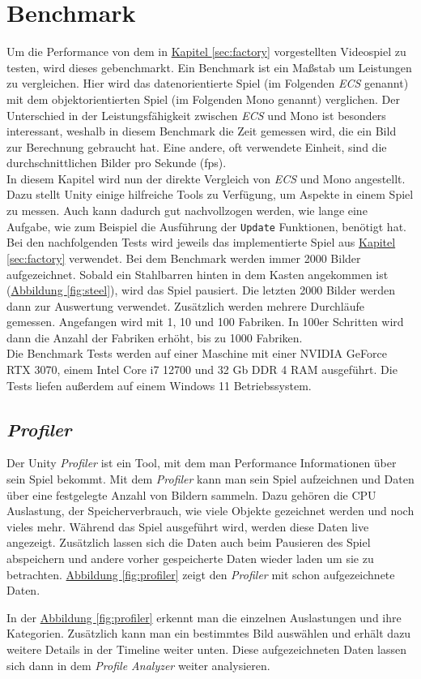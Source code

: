 \section{Benchmark}
Um die Performance von dem in \hyperref[sec:factory]{Kapitel \ref{sec:factory}} vorgestellten Videospiel zu testen, wird dieses gebenchmarkt. Ein Benchmark ist ein Maßstab um Leistungen zu vergleichen. Hier wird das datenorientierte Spiel (im Folgenden \textit{ECS} genannt) mit dem objektorientierten Spiel (im Folgenden Mono genannt) verglichen. Der Unterschied in der Leistungsfähigkeit zwischen \textit{ECS} und Mono ist besonders interessant, weshalb in diesem Benchmark die Zeit gemessen wird, die ein Bild zur Berechnung gebraucht hat. Eine andere, oft verwendete Einheit, sind die durchschnittlichen Bilder pro Sekunde (fps).\\
In diesem Kapitel wird nun der direkte Vergleich von \textit{ECS} und Mono angestellt. Dazu stellt Unity einige hilfreiche Tools zu Verfügung, um Aspekte in einem Spiel zu messen. Auch kann dadurch gut nachvollzogen werden, wie lange eine Aufgabe, wie zum Beispiel die Ausführung der \texttt{Update} Funktionen, benötigt hat. Bei den nachfolgenden Tests wird jeweils das implementierte Spiel aus \hyperref[sec:factory]{Kapitel \ref*{sec:factory}} verwendet. Bei dem Benchmark werden immer 2000 Bilder aufgezeichnet. Sobald ein Stahlbarren hinten in dem Kasten angekommen ist (\hyperref[fig:steel]{Abbildung \ref*{fig:steel}}), wird das Spiel pausiert. Die letzten 2000 Bilder werden dann zur Auswertung verwendet. Zusätzlich werden mehrere Durchläufe gemessen. Angefangen wird mit 1, 10 und 100 Fabriken. In 100er Schritten wird dann die Anzahl der Fabriken erhöht, bis zu 1000 Fabriken.\\
Die Benchmark Tests werden auf einer Maschine mit einer NVIDIA GeForce RTX 3070, einem Intel Core i7 12700 und 32 Gb DDR 4 RAM ausgeführt. Die Tests liefen außerdem auf einem Windows 11 Betriebssystem.
\subsection{\textit{Profiler}}
Der Unity \textit{Profiler} ist ein Tool, mit dem man Performance Informationen über sein Spiel bekommt. Mit dem \textit{Profiler} kann man sein Spiel aufzeichnen und Daten über eine festgelegte Anzahl von Bildern sammeln. Dazu gehören die CPU Auslastung, der Speicherverbrauch, wie viele Objekte gezeichnet werden und noch vieles mehr. Während das Spiel ausgeführt wird, werden diese Daten live angezeigt. Zusätzlich lassen sich die Daten auch beim Pausieren des Spiel abspeichern und andere vorher gespeicherte Daten wieder laden um sie zu betrachten. \hyperref[fig:profiler]{Abbildung \ref*{fig:profiler}} zeigt den \textit{Profiler} mit schon aufgezeichnete Daten. 

In der \hyperref[fig:profiler]{Abbildung \ref*{fig:profiler}} erkennt man die einzelnen Auslastungen und ihre Kategorien. Zusätzlich kann man ein bestimmtes Bild auswählen und erhält dazu weitere Details in der Timeline weiter unten. Diese aufgezeichneten Daten lassen sich dann in dem \textit{Profile Analyzer} weiter analysieren.
